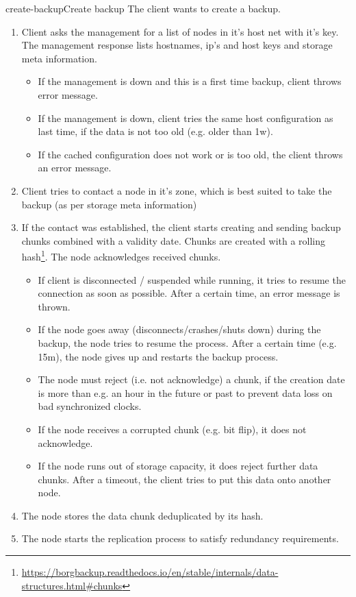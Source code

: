 \begin{scenario}{create-backup}{Create backup}
    The client wants to create a backup.
    
    \begin{enumerate}
    	\item Client asks the management for a list of nodes in it's host net with it's key. The management response lists hostnames, ip's and host keys and storage meta information.
    		\begin{itemize}
    			\item If the management is down and this is a first time backup, client throws error message.
   				\item If the management is down, client tries the same host configuration as last time, if the data is not too old (e.g. older than 1w).
   				\item If the cached configuration does not work or is too old, the client throws an error message.
   			\end{itemize}
   		\item Client tries to contact a node in it's zone, which is best suited to take the backup (as per storage meta information)
   		\item If the contact was established, the client starts creating and sending backup chunks combined with a validity date. Chunks are created with a rolling hash\footnote{\url{https://borgbackup.readthedocs.io/en/stable/internals/data-structures.html\#chunks}}. The node acknowledges received chunks.
	   		 \begin{itemize}
	   			\item If client is disconnected / suspended while running, it tries to resume the connection as soon as possible. After a certain time, an error message is thrown.
	   			\item If the node goes away (disconnects/crashes/shuts down) during the backup, the node tries to resume the process. After a certain time (e.g. 15m), the node gives up and restarts the backup process.
	   			\item The node must reject (i.e. not acknowledge) a chunk, if the creation date is more than e.g. an hour in the future or past to prevent data loss on bad synchronized clocks.
	   			\item If the node receives a corrupted chunk (e.g. bit flip), it does not acknowledge.
	   			\item If the node runs out of storage capacity, it does reject further data chunks. After a timeout, the client tries to put this data onto another node.
	   		\end{itemize}
	   	\item The node stores the data chunk deduplicated by its hash.
	   	\item The node starts the replication process to satisfy redundancy requirements.
    \end{enumerate}
\end{scenario}


